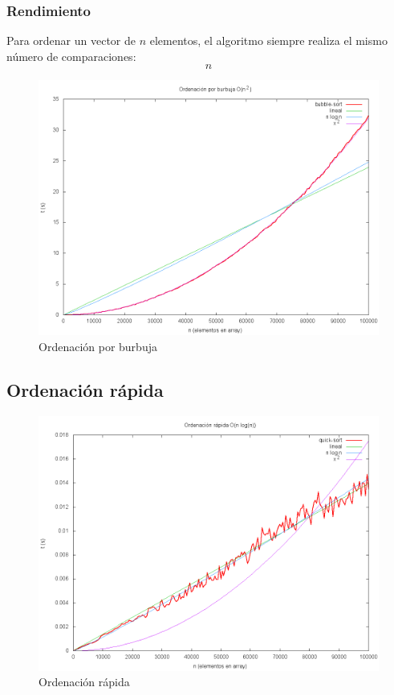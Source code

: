 \subsubsection{Rendimiento}
Para ordenar un vector de $n$ elementos, el algoritmo siempre realiza el mismo número de comparaciones:
\[n\]
	\begin{figure}[H]
	  \centering
	    \includegraphics[width=1.0\textwidth]{bubble-sort.png}
	  \caption{Ordenación por burbuja}
	  \label{fig:bubble}
	\end{figure}

\subsection{Ordenación r\'apida}

	\begin{figure}[H]
  		\centering
   	 	\includegraphics[width=1.0\textwidth]{quick-sort.png}
  		\caption{Ordenación rápida}
  		\label{fig:quick}
	\end{figure}
	
